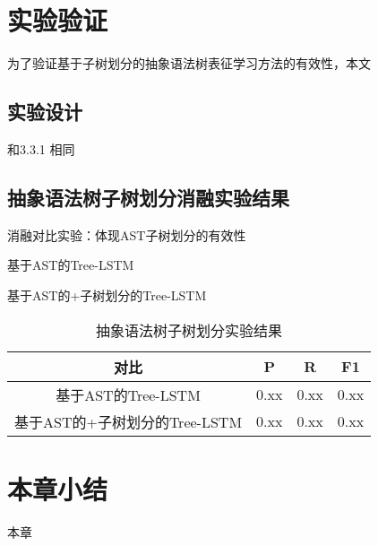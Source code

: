 \section{实验验证}
为了验证基于子树划分的抽象语法树表征学习方法的有效性，本文
\subsection{实验设计}
和3.3.1 相同
\subsection{抽象语法树子树划分消融实验结果}
消融对比实验：体现AST子树划分的有效性

基于AST的Tree-LSTM

基于AST的+子树划分的Tree-LSTM

\begin{table}
  \centering
  \caption{抽象语法树子树划分实验结果} %
  \begin{tabular*}{0.9\textwidth}{@{\extracolsep{\fill}}cccc}
  \toprule
    对比			&P		&R		&F1 \\
  \midrule
    基于AST的Tree-LSTM			&0.xx	&0.xx		&0.xx \\
    基于AST的+子树划分的Tree-LSTM			&0.xx		&0.xx		&0.xx \\
  \bottomrule
  \end{tabular*}
\end{table}

\section{本章小结}
本章



